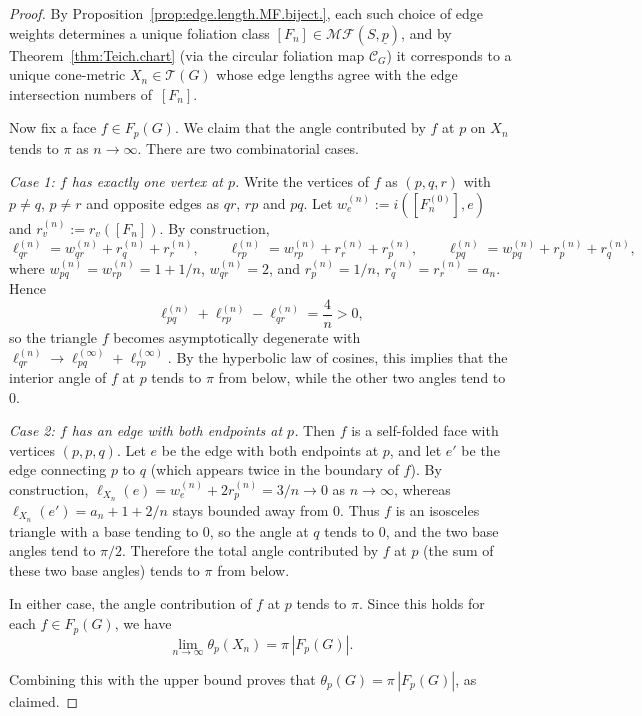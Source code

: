 \documentclass[11pt, letterpaper]{amsart}
\theoremstyle{definition}
\theoremstyle{remark}
\newcommand{\up}{\underline{p}}
\newcommand{\cMFp}{\mathcal{MF} (S,\up)}
\newcommand{\cC}{\mathcal{C}}
\newcommand{\cT}{\mathcal{T}}
\numberwithin{equation}{section}
\begin{document}
\begin{proof}
By Proposition~\ref{prop:edge.length.MF.biject.}, each such choice of edge
weights determines a unique foliation class \([F_n]\in\cMFp\), and by
Theorem~\ref{thm:Teich.chart} (via the circular foliation map \(\cC_G\)) it
corresponds to a unique cone-metric \(X_n\in\cT(G)\) whose edge lengths
agree with the edge intersection numbers of~\([F_n]\).

Now fix a face \(f\in F_p(G)\).  We claim that the angle contributed by \(f\) at \(p\) on \(X_n\)
tends to \(\pi\) as \(n\to\infty\). There are two combinatorial cases.

\smallskip\noindent
\emph{Case 1: \(f\) has exactly one vertex at \(p\).}
Write the vertices of \(f\) as \((p,q,r)\) with \(p\not= q\), \(p\not=r\) and opposite edges as \(qr\), \(rp\) and \(pq\). Let \(w^{(n)}_e:=i([F^{(0)}_n],e)\) and \(r^{(n)}_v:=r_v([F_n])\).
By construction,
\[
\ell_{qr}^{(n)}=w^{(n)}_{qr}+r^{(n)}_q+r^{(n)}_r,\qquad
\ell_{rp}^{(n)}=w^{(n)}_{rp}+r^{(n)}_r+r^{(n)}_p,\qquad
\ell_{pq}^{(n)}=w^{(n)}_{pq}+r^{(n)}_p+r^{(n)}_q,
\]
where \(w^{(n)}_{pq}=w^{(n)}_{rp}=1+1/n\), \(w^{(n)}_{qr}=2\), and \(r^{(n)}_p=1/n\), \(r^{(n)}_q=r^{(n)}_r=a_n\).
Hence
\[
\ell_{pq}^{(n)}+\ell_{rp}^{(n)}-\ell_{qr}^{(n)} = \frac{4}{n}>0,
\]
so the triangle \(f\) becomes asymptotically degenerate with
\(\ell_{qr}^{(n)}\to \ell_{pq}^{(\infty)}+\ell_{rp}^{(\infty)}\).
By the hyperbolic law of cosines, this implies that the interior angle of \(f\) at \(p\)
tends to \(\pi\) from below, while the other two angles tend to \(0\).

\smallskip\noindent
\emph{Case 2: \(f\) has an edge with both endpoints at \(p\).}
Then \(f\) is a self-folded face with vertices \((p,p,q)\).
Let \(e\) be the edge with both endpoints at \(p\), and let \(e'\) be the edge connecting \(p\) to \(q\)
(which appears twice in the boundary of \(f\)).
By construction, \(\ell_{X_n}(e)=w^{(n)}_e+2r^{(n)}_p=3/n\to0\) as \(n\to\infty\), whereas \(\ell_{X_n}(e')=a_n+1+2/n\) stays bounded away from \(0\).
Thus \(f\) is an isosceles triangle with a base tending to \(0\), so the angle at \(q\) tends to \(0\),
and the two base angles tend to \(\pi/2\). Therefore the total angle contributed by \(f\) at \(p\)
(the sum of these two base angles) tends to \(\pi\) from below.

\smallskip
In either case, the angle contribution of \(f\) at \(p\) tends to \(\pi\).
Since this holds for each \(f\in F_p(G)\), we have
\[
\lim_{n\to\infty}\theta_p(X_n)=\pi\,|F_p(G)|.
\]

Combining this with the upper bound proves that
\(\theta_p(G)=\pi\,|F_p(G)|\), as claimed.
\end{proof}
\end{document}
